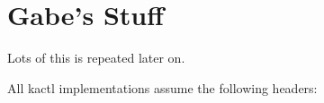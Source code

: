 \chapter{Gabe's Stuff}

Lots of this is repeated later on.


All kactl implementations assume the following headers:

